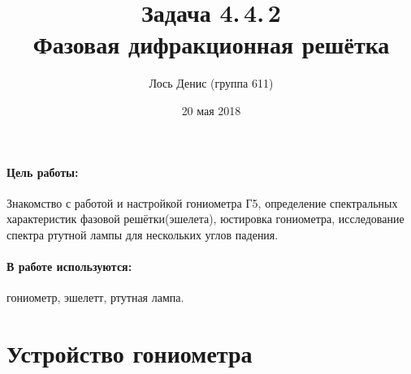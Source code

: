 \documentclass[12pt]{article}
\title{{\bf Задача 4.\,4.\,2 \\ Фазовая дифракционная решётка}}
\author{Лось Денис (группа 611)}
\date{20 мая 2018}
\begin{document}
\maketitle

\paragraph*{Цель работы: } Знакомство с работой и настройкой гониометра Г5, определение спектральных характеристик фазовой решётки(эшелета), юстировка гониометра, исследование спектра ртутной лампы для нескольких углов падения.

\paragraph*{В работе используются: } гониометр, эшелетт, ртутная лампа.

\section*{Устройство гониометра}
\end{document}

